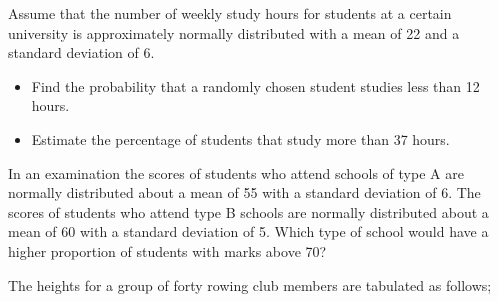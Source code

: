 \documentclass[]{article}
\begin{document}
Assume that the number of weekly study hours for students at a certain university
is approximately normally distributed with a mean of 22 and a standard deviation
of 6.
\begin{itemize}
\item Find the probability that a randomly chosen student studies less than 12
hours.
\item Estimate the percentage of students that study more than 37 hours.
\end{itemize}


%
%
%
%
%
In an examination the scores of students who attend schools of type A are
normally distributed about a mean of 55 with a standard deviation of 6. The
scores of students who attend type B schools are normally distributed about a
mean of 60 with a standard deviation of 5.
Which type of school would have a higher proportion of students with marks above 70?

The heights for a group of forty rowing club members are tabulated as follows;
\end{document}
